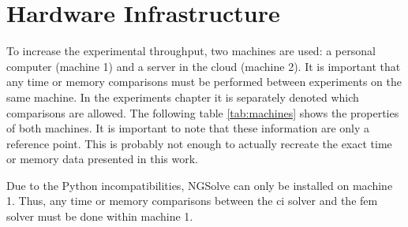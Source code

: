 \documentclass[./\jobname.tex]{subfiles}
\begin{document}
\section{Hardware Infrastructure}
\label{chap:hardware_setup}

To increase the experimental throughput, two machines are used: a personal computer (machine 1) and a server in the cloud (machine 2). It is important that any time or memory comparisons must be performed between experiments on the same machine. In the experiments chapter it is separately denoted which comparisons are allowed. The following table \ref{tab:machines} shows the properties of both machines. It is important to note that these information are only a reference point. This is probably not enough to actually recreate the exact time or memory data presented in this work. 

\begin{table}[h]
	\centering
	\noindent{}
	\label{tab:machines}
\end{table}

Due to the Python incompatibilities, NGSolve can only be installed on machine 1. Thus, any time or memory comparisons between the \gls{ci} solver and the \gls{fem} solver must be done within machine 1. 
\end{document}
